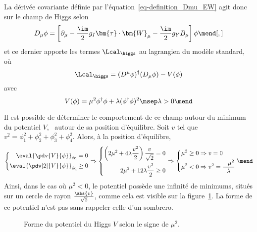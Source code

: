 \par La dérivée covariante définie par l'équation~\eqref{eq-definition_Dmu_EW} agit donc sur le champ de Higgs selon
\begin{equation}
D_\mu \phi = \left[ \partial_\mu - \frac{\im}{2}g_I \bm{\tau}\cdot\bm{W}_\mu - \frac{\im}{2}g_YB_\mu \right] \phi
\mend[,]
\end{equation}
et ce dernier apporte les termes $\Lcal_{\higgs}$ au lagrangien du modèle standard, où
\begin{equation}
\Lcal_{\higgs} = (D^\mu\phi)^\dagger(D_\mu\phi) - V(\phi)
\end{equation}
avec
\begin{equation}
V(\phi)
= \mu^2\phi^\dagger\phi + \lambda (\phi^\dagger\phi)^2
\msep \lambda > 0
\mend
\label{eq-chapter-MS-MSSM-section-formalisme-subsec-Higgs_mechanism-SM_Higgs_potential}
\end{equation}
\par Il est possible de déterminer le comportement de ce champ autour du minimum du potentiel $V$, \ie\ autour de sa position d'équilibre.
Soit $v$ tel que $v^2=\phi_1^2+\phi_2^2+\phi_3^2+\phi_4^2$.
Alors, à la position d'équilibre,
\begin{equation}
\left\lbrace
\begin{aligned}
\eval{\pdv{V}{\phi}}_\text{éq}=0
\\
\eval{\pdv[2]{V}{\phi}}_\text{éq}\geq0
\end{aligned}
\right.
\Rightarrow
\left\lbrace
\begin{aligned}
\left(2\mu^2 + 4\lambda \frac{v^2}{2}\right) \frac{v}{\sqrt{2}} = 0
\\
2\mu^2 + 12\lambda \frac{v^2}{2} \geq0
\end{aligned}
\right.
\Rightarrow
\left\lbrace
\begin{aligned}
\mu^2 \geq 0 &\Rightarrow v = 0
\\
\mu^2 < 0 &\Rightarrow v^2 = \frac{-\mu^2}{\lambda}
\end{aligned}
\right.
\mend
\end{equation}
Ainsi, dans le cas où $\mu^2<0$, le potentiel possède une infinité de minimums, situés sur un cercle de rayon $\frac{\abs{v}}{\sqrt{2}}$, comme cela est visible sur la figure~\ref{fig-rpztation_3d_V_Higgs}. La forme de ce potentiel n'est pas sans rappeler celle d'un sombrero.
\begin{figure}[h]
\centering

\caption{Forme du potentiel du Higgs $V$ selon le signe de $\mu^2$.}
\label{fig-rpztation_3d_V_Higgs}
\end{figure}
